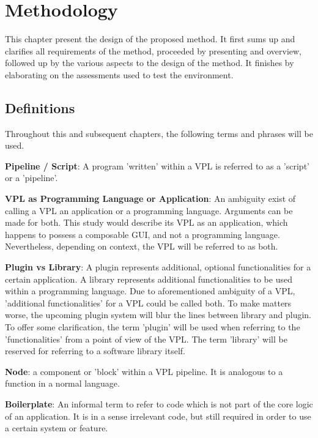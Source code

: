 \chapter{Methodology}
\label{chap:methodology}

This chapter present the design of the proposed method. 
It first sums up and clarifies all requirements of the method, proceeded by presenting and overview, followed up by the various aspects to the design of the method. 
It finishes by elaborating on the assessments used to test the environment. 

\section{Definitions}

Throughout this and subsequent chapters, the following terms and phrases will be used.

\textbf{Pipeline / Script}: A program 'written' within a VPL is referred to as a 'script' or a 'pipeline'.

\textbf{VPL as Programming Language or Application}: An ambiguity exist of calling a VPL an application or a programming language. 
Arguments can be made for both. 
This study would describe its VPL as an application, which happens to possess a composable \ac{GUI}, and not a programming language.
Nevertheless, depending on context, the VPL will be referred to as both.

\textbf{Plugin vs Library}: A plugin represents additional, optional functionalities for a certain application.
A library represents additional functionalities to be used within a programming language. 
Due to aforementioned ambiguity of a VPL, 'additional functionalities' for a VPL could be called both. 
To make matters worse, the upcoming plugin system will blur the lines between library and plugin. 
To offer some clarification, the term 'plugin' will be used when referring to the 'functionalities' from a point of view of the VPL.
The term 'library' will be reserved for referring to a software library itself. 

\textbf{Node}: a component or 'block' within a VPL pipeline. It is analogous to a function in a normal language.

\textbf{Boilerplate}: An informal term to refer to code which is not part of the core logic of an application. It is in a sense irrelevant code, but still required in order to use a certain system or feature. 

